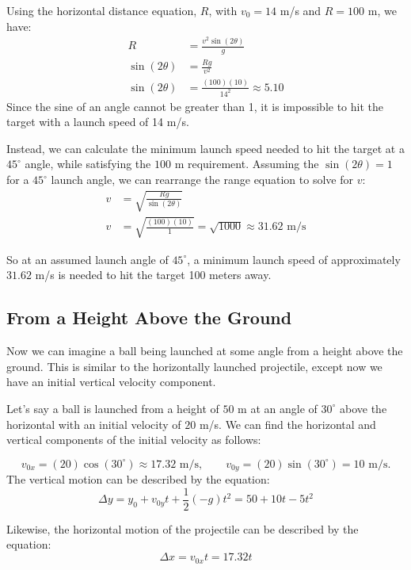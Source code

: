 \begin{Answer}[ref=projectiles_angle3]

Using the horizontal distance equation, $R$, with $v_0 = 14$ m/s and $R = 100$ m, we have:
\begin{align*}
R&=\frac{v^2\sin(2\theta)}{g} \\ 
\sin(2\theta) &= \frac{Rg}{v^2} \\
\sin(2\theta) &= \frac{(100)(10)}{14^2} \approx 5.10
\end{align*}
Since the sine of an angle cannot be greater than 1, it is impossible to hit the target with a launch speed of 14 m/s.

Instead, we can calculate the minimum launch speed needed to hit the target at a $45^\circ$ angle, while satisfying the $100$ m requirement. Assuming the $\sin(2\theta) = 1$ for a $45^\circ$ launch angle, we can rearrange the range equation to solve for $v$:
\begin{align*}
v &= \sqrt{\frac{Rg}{\sin(2\theta)}} \\
v &= \sqrt{\frac{(100)(10)}{1}} = \sqrt{1000} \approx 31.62 \text{ m/s}
\end{align*}

So at an assumed launch angle of $45^\circ$, a minimum launch speed of approximately $31.62$ m/s is needed to hit the target 100 meters away.
\end{Answer}


\subsection{From a Height Above the Ground}
Now we can imagine a ball being launched at some angle from a height above the ground. This is similar to the horizontally launched projectile, except now we have an initial vertical velocity component.

Let's say a ball is launched from a height of $50$ m at an angle of $30^\circ$ above the horizontal with an initial velocity of $20$ m/s. We can find the horizontal and vertical components of the initial velocity as follows:


$$v_{0x} = (20) \cos(30^\circ) \approx 17.32 \text{ m/s}, \qquad v_{0y} = (20) \sin(30^\circ) = 10 \text{ m/s}.$$
The vertical motion can be described by the equation:
\[\Delta y = y_0 + v_{0y} t + \frac{1}{2} (-g) t^2 = 50+ 10t - 5t^2\]

Likewise, the horizontal motion of the projectile can be described by the equation:
\[\Delta x = v_{0x} t = 17.32t\]

